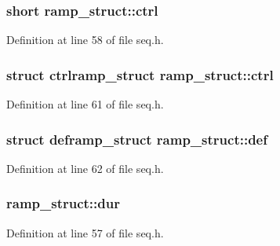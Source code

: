 \subsubsection[{\texorpdfstring{ctrl}{ctrl}}]{\setlength{\rightskip}{0pt plus 5cm}short ramp\+\_\+struct\+::ctrl}\hypertarget{structramp__struct_a6c42d8fea6f5fe3c78720567f378f84a}{}\label{structramp__struct_a6c42d8fea6f5fe3c78720567f378f84a}


Definition at line 58 of file seq.\+h.

\subsubsection[{\texorpdfstring{ctrl}{ctrl}}]{\setlength{\rightskip}{0pt plus 5cm}struct {\bf ctrlramp\+\_\+struct} ramp\+\_\+struct\+::ctrl}\hypertarget{structramp__struct_a4e0cae119e90c78b3d9cc1410d7f221e}{}\label{structramp__struct_a4e0cae119e90c78b3d9cc1410d7f221e}


Definition at line 61 of file seq.\+h.

\subsubsection[{\texorpdfstring{def}{def}}]{\setlength{\rightskip}{0pt plus 5cm}struct {\bf deframp\+\_\+struct} ramp\+\_\+struct\+::def}\hypertarget{structramp__struct_af03e5115133e11ba0032e068b6964182}{}\label{structramp__struct_af03e5115133e11ba0032e068b6964182}


Definition at line 62 of file seq.\+h.

\subsubsection[{\texorpdfstring{dur}{dur}}]{ ramp\+\_\+struct\+::dur}\hypertarget{structramp__struct_a90b783b1e8896c8d1c486f0217ddf4a9}{}\label{structramp__struct_a90b783b1e8896c8d1c486f0217ddf4a9}


Definition at line 57 of file seq.\+h.

